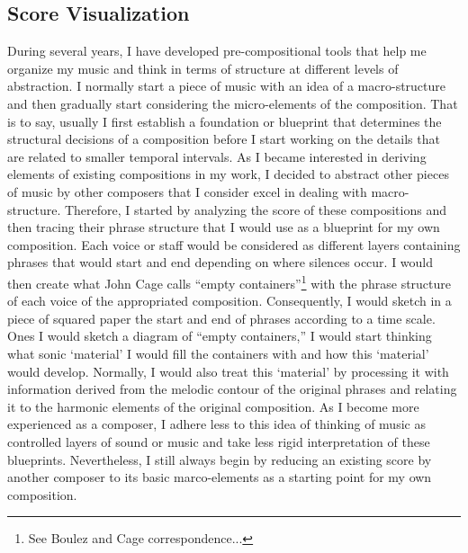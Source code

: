 \subsection{Score Visualization}

During several years, I have developed pre-compositional tools that help me organize my music and think in terms of structure at different levels of abstraction. I normally start a piece of music with an idea of a macro-structure and then gradually start considering the micro-elements of the composition. That is to say, usually I first establish a foundation or blueprint that determines the structural decisions of a composition before I start working on the details that are related to smaller temporal intervals. As I became interested in deriving elements of existing compositions in my work, I decided to abstract other pieces of music by other composers that I consider excel in dealing with macro-structure. Therefore, I started by analyzing the score of these compositions and then tracing their phrase structure that I would use as a blueprint for my own composition. Each voice or staff would be considered as different layers containing phrases that would start and end depending on where silences occur. I would then create what John Cage calls ``empty containers''\footnote{See Boulez and Cage correspondence...} with the phrase structure of each voice of the appropriated composition. Consequently, I would sketch in a piece of squared paper the start and end of phrases according to a time scale. Ones I would sketch a diagram of ``empty containers,'' I would start thinking what sonic `material' I would fill the containers with and how this `material' would develop. Normally, I would also treat this `material' by processing it with information derived from the melodic contour of the original phrases and relating it to the harmonic elements of the original composition. As I become more experienced as a composer, I adhere less to this idea of thinking of music as controlled layers of sound or music and take less rigid interpretation of these blueprints. Nevertheless, I still always begin by reducing an existing score by another composer to its basic marco-elements as a starting point for my own composition. 

